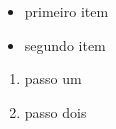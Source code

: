 \begin{itemize}[nosep]
\item primeiro item
\item segundo item
\end{itemize}

\begin{enumerate}[nosep]
\item passo um
\item passo dois
\end{enumerate}
